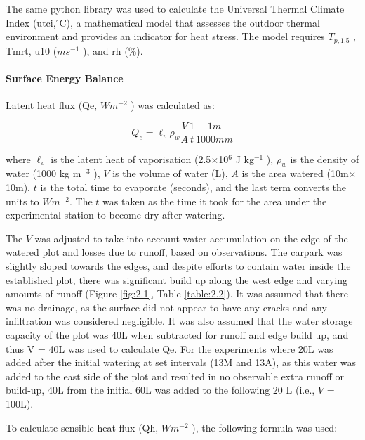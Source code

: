 \documentclass[final,3p,times,authoryear]{elsarticle}
\begin{document}
The same python library was used to calculate the Universal Thermal Climate Index (\gls{utci},$^{\circ}$C), a mathematical model that assesses the outdoor thermal environment and provides an indicator for heat stress. The model requires $T_{p,1.5}$ , \gls{Tmrt}, \gls{u10} ($ms^{-1}$ ), and \gls{rh} (\%).



\paragraph{Surface Energy Balance}\label{sec:appendix7.4.5}

Latent heat flux (\gls{Qe}, $Wm^{-2}$ ) was calculated as:

\begin{equation}
Q_{e} = \ell _{v} \rho_{w} \frac{V}{A} \frac{1}{t} \frac{1m}{1000mm}
\label{eq:7.11}
\end{equation}

where $\ell _{v}$ is the latent heat of vaporisation (2.5$\times$10$^{6}$ J kg$^{-1}$ ), $\rho_{w}$ is the density of water (1000 kg m$^{-3}$ ), $V$ is the volume of water (L), $A$ is the area watered (10m$\times$10m), $t$ is the total time to evaporate (seconds), and the last term converts the units to $Wm^{-2}$. The $t$ was taken as the time it took for the area under the experimental station to become dry after watering.

The $V$ was adjusted to take into account water accumulation on the edge of the watered plot and losses due to runoff, based on observations. The carpark was slightly sloped towards the edges, and despite efforts to contain water inside the established plot, there was significant build up along the west edge and varying amounts of runoff (Figure \ref{fig:2.1}, Table \ref{table:2.2}). It was assumed that there was no drainage, as the surface did not appear to have any cracks and any infiltration was considered negligible. It was also assumed that the water storage capacity of the plot was 40L when subtracted for runoff and edge build up, and thus V = 40L was used to calculate \gls{Qe}. For the experiments where 20L was added after the initial watering at set intervals (13M and 13A), as this water was added to the east side of the plot and resulted in no observable extra runoff or build-up, 40L from the initial 60L was added to the following 20 L (i.e., $V$ = 100L).

To calculate sensible heat flux (\gls{Qh}, $Wm^{-2}$ ), the following formula was used:
\end{document}
